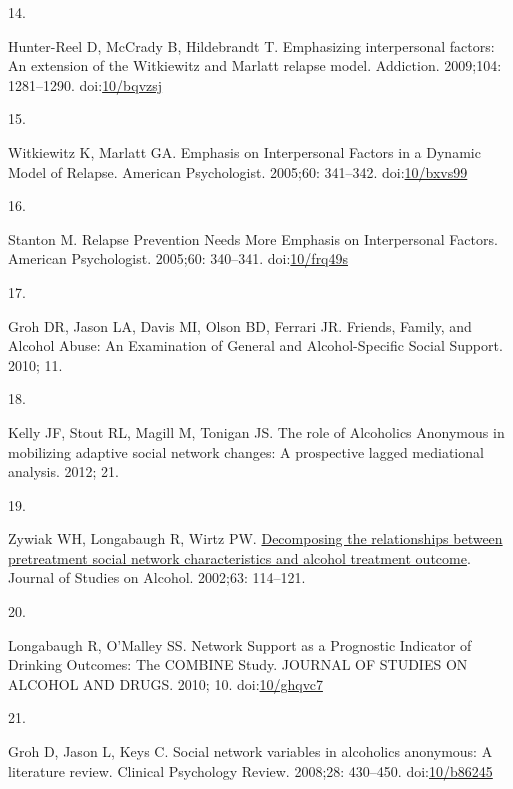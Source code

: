 \documentclass[
  letterpaper,
  DIV=11,
  numbers=noendperiod]{scrartcl}
\newlength{\cslhangindent}
\newlength{\csllabelwidth}
\newenvironment{CSLReferences}[2] %
 {\begin{list}{}{%
  \setlength{\itemindent}{0pt}
  \setlength{\leftmargin}{0pt}
  \setlength{\parsep}{0pt}
  \ifodd #1
   \setlength{\leftmargin}{\cslhangindent}
   \setlength{\itemindent}{-1\cslhangindent}
  \fi
  \setlength{\itemsep}{#2\baselineskip}}}
 {\end{list}}
\newcommand{\CSLLeftMargin}[1]{\parbox[t]{\csllabelwidth}{\strut#1\strut}}
\newcommand{\CSLRightInline}[1]{\parbox[t]{\linewidth - \csllabelwidth}{\strut#1\strut}}
\begin{document}
\begin{CSLReferences}{0}{1}
\CSLLeftMargin{14. }%
\CSLRightInline{Hunter-Reel D, McCrady B, Hildebrandt T. Emphasizing
interpersonal factors: An extension of the {Witkiewitz} and {Marlatt}
relapse model. Addiction. 2009;104: 1281--1290.
doi:\href{https://doi.org/10/bqvzsj}{10/bqvzsj}}

\CSLLeftMargin{15. }%
\CSLRightInline{Witkiewitz K, Marlatt GA. Emphasis on {Interpersonal
Factors} in a {Dynamic Model} of {Relapse}. American Psychologist.
2005;60: 341--342. doi:\href{https://doi.org/10/bxvs99}{10/bxvs99}}

\CSLLeftMargin{16. }%
\CSLRightInline{Stanton M. Relapse {Prevention Needs More Emphasis} on
{Interpersonal Factors}. American Psychologist. 2005;60: 340--341.
doi:\href{https://doi.org/10/frq49s}{10/frq49s}}

\CSLLeftMargin{17. }%
\CSLRightInline{Groh DR, Jason LA, Davis MI, Olson BD, Ferrari JR.
Friends, {Family}, and {Alcohol Abuse}: {An Examination} of {General}
and {Alcohol-Specific Social Support}. 2010; 11. }

\CSLLeftMargin{18. }%
\CSLRightInline{Kelly JF, Stout RL, Magill M, Tonigan JS. The role of
{Alcoholics Anonymous} in mobilizing adaptive social network changes:
{A} prospective lagged mediational analysis. 2012; 21. }

\CSLLeftMargin{19. }%
\CSLRightInline{Zywiak WH, Longabaugh R, Wirtz PW.
\href{https://www.ncbi.nlm.nih.gov/pubmed/11925053}{Decomposing the
relationships between pretreatment social network characteristics and
alcohol treatment outcome}. Journal of Studies on Alcohol. 2002;63:
114--121. }

\CSLLeftMargin{20. }%
\CSLRightInline{Longabaugh R, O'Malley SS. Network {Support} as a
{Prognostic Indicator} of {Drinking Outcomes}: {The COMBINE Study}.
JOURNAL OF STUDIES ON ALCOHOL AND DRUGS. 2010; 10.
doi:\href{https://doi.org/10/ghqvc7}{10/ghqvc7}}

\CSLLeftMargin{21. }%
\CSLRightInline{Groh D, Jason L, Keys C. Social network variables in
alcoholics anonymous: {A} literature review. Clinical Psychology Review.
2008;28: 430--450. doi:\href{https://doi.org/10/b86245}{10/b86245}}


\end{CSLReferences}
\end{document}
